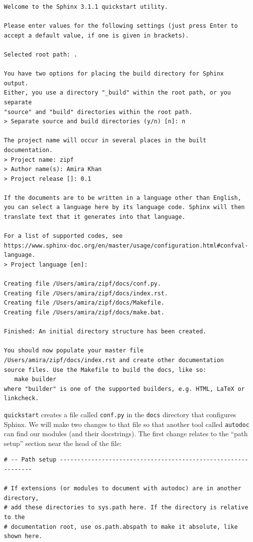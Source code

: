 \documentclass[
]{krantz}
\begin{document}
\begin{verbatim}
Welcome to the Sphinx 3.1.1 quickstart utility.

Please enter values for the following settings (just press Enter to
accept a default value, if one is given in brackets).

Selected root path: .

You have two options for placing the build directory for Sphinx output.
Either, you use a directory "_build" within the root path, or you separate
"source" and "build" directories within the root path.
> Separate source and build directories (y/n) [n]: n

The project name will occur in several places in the built documentation.
> Project name: zipf
> Author name(s): Amira Khan
> Project release []: 0.1

If the documents are to be written in a language other than English,
you can select a language here by its language code. Sphinx will then
translate text that it generates into that language.

For a list of supported codes, see
https://www.sphinx-doc.org/en/master/usage/configuration.html#confval-language.
> Project language [en]:

Creating file /Users/amira/zipf/docs/conf.py.
Creating file /Users/amira/zipf/docs/index.rst.
Creating file /Users/amira/zipf/docs/Makefile.
Creating file /Users/amira/zipf/docs/make.bat.

Finished: An initial directory structure has been created.

You should now populate your master file /Users/amira/zipf/docs/index.rst and create other documentation
source files. Use the Makefile to build the docs, like so:
   make builder
where "builder" is one of the supported builders, e.g. HTML, LaTeX or linkcheck.
\end{verbatim}

\texttt{quickstart} creates a file called \texttt{conf.py} in the \texttt{docs} directory that configures Sphinx.
We will make two changes to that file
so that another tool called \texttt{autodoc} can find our modules (and their docstrings).
The first change relates to the ``path setup'' section near the head of the file:

\begin{verbatim}
# -- Path setup --------------------------------------------------------------

# If extensions (or modules to document with autodoc) are in another directory,
# add these directories to sys.path here. If the directory is relative to the
# documentation root, use os.path.abspath to make it absolute, like shown here.
\end{verbatim}
\end{document}
